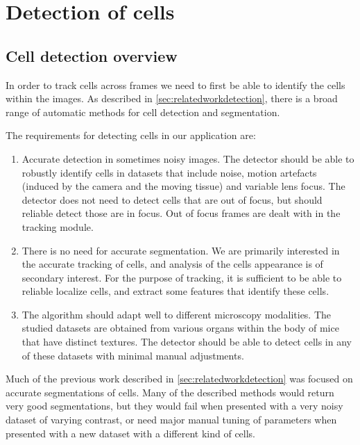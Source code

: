 \chapter{Detection of cells }
	\label{chap:cell_detection}
	
	\section{Cell detection overview \statusfirstdraft}
	
	In order to track cells across frames we need to first be able to identify the cells within the images. As described in \cref{sec:relatedworkdetection}, there is a broad range of automatic methods for cell detection and segmentation.
	
	The requirements for detecting cells in our application are:
		
	\begin{enumerate}
	\item Accurate detection in sometimes noisy images. The detector should be able to robustly identify cells in datasets that include noise, motion artefacts (induced by the camera and the moving tissue) and variable lens focus. The detector does not need to detect cells that are out of focus, but should reliable detect those are in focus. Out of focus frames are dealt with in the tracking module.
	
	\item There is no need for accurate segmentation. We are primarily interested in the accurate tracking of cells, and analysis of the cells appearance is of secondary interest. For the purpose of tracking, it is sufficient to be able to reliable localize cells, and extract some features that identify these cells.
	
	\item The algorithm should adapt well to different microscopy modalities. The studied datasets are obtained from various organs within the body of mice that have distinct textures. The detector should be able to detect cells in any of these datasets with minimal  manual adjustments.
	\end{enumerate}
	
	Much of the previous work described in \cref{sec:relatedworkdetection} was focused on accurate segmentations of cells. Many of the described methods would return very good segmentations, but they would fail when presented with a very noisy dataset of varying contrast, or need major manual tuning of parameters when presented with a new dataset with a different kind of cells.
	
